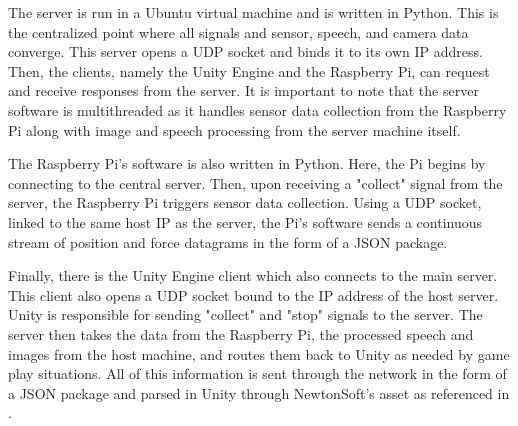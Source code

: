\documentclass[titlepage, 12pt]{scrartcl}
\begin{document}
        The server is run in a Ubuntu virtual machine and is written in Python. This is the centralized point where all signals and sensor, speech, and camera data converge. This server opens a UDP socket and binds it to its own IP address. Then, the clients, namely the Unity Engine and the Raspberry Pi, can request and receive responses from the server. It is important to note that the server software is multithreaded as it handles sensor data collection from the Raspberry Pi along with image and speech processing from the server machine itself. \par
        The Raspberry Pi's software is also written in Python. Here, the Pi begins by connecting to the central server. Then, upon receiving a "collect" signal from the server, the Raspberry Pi triggers sensor data collection. Using a UDP socket, linked to the same host IP as the server, the Pi's software sends a continuous stream of position and force datagrams in the form of a JSON package. \par
        Finally, there is the Unity Engine client which also connects to the main server. This client also opens a UDP socket bound to the IP address of the host server. Unity is responsible for sending "collect" and "stop" signals to the server. The server then takes the data from the Raspberry Pi, the processed speech and images from the host machine, and routes them back to Unity as needed by game play situations. All of this information is sent through the network in the form of a JSON package and parsed in Unity through NewtonSoft's asset as referenced in \cite{newtonsoft}.  \par
\end{document}
